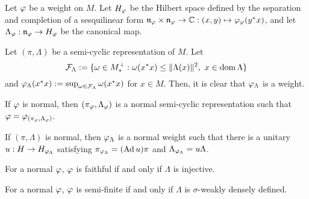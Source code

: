 \documentclass{../../small}
\begin{document}
\begin{prop}
Let $\varphi$ be a weight on $M$.
Let $H_\varphi$ be the Hilbert space defined by the separation and completion of a sesquilinear form $\mathfrak{n}_\varphi\times\mathfrak{n}_\varphi\to\mathbb{C}:(x,y)\mapsto\varphi_\varphi(y^*x)$, and let $\Lambda_\varphi:\mathfrak{n}_\varphi\to H_\varphi$ be the canonical map.

Let $(\pi,\Lambda)$ be a semi-cyclic representation of $M$.
Let
\[\mathcal{F}_\Lambda:=\{\omega\in M_*^+:\omega(x^*x)\le\|\Lambda(x)\|^2,\ x\in\operatorname{dom}\Lambda\}\]
and $\varphi_\Lambda(x^*x):=\sup_{\omega\in\mathcal{F}_\Lambda}\omega(x^*x)$ for $x\in M$.
Then, it is clear that $\varphi_\Lambda$ is a weight.
\begin{parts}
\item If $\varphi$ is normal, then $(\pi_\varphi,\Lambda_\varphi)$ is a normal semi-cyclic representation such that $\varphi=\varphi_{(\pi_\varphi,\Lambda_\varphi)}$.
\item If $(\pi,\Lambda)$ is normal, then $\varphi_\Lambda$ is a normal weight such that there is a unitary $u:H\to H_{\varphi_\Lambda}$ satisfying $\pi_{\varphi_\Lambda}=(\operatorname{Ad} u)\pi$ and $\Lambda_{\varphi_\Lambda}=u\Lambda$.
\item For a normal $\varphi$, $\varphi$ is faithful if and only if $\Lambda$ is injective.
\item For a normal $\varphi$, $\varphi$ is semi-finite if and only if $\Lambda$ is $\sigma$-weakly densely defined.
\end{parts}
\end{prop}
\end{document}
